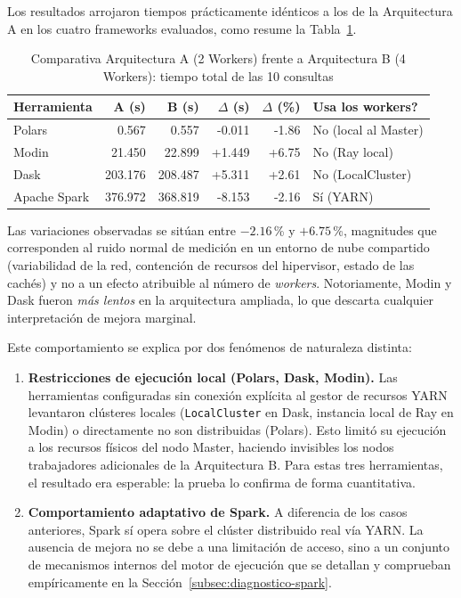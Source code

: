 Los resultados arrojaron tiempos prácticamente idénticos a los de la Arquitectura A en los cuatro frameworks evaluados, como resume la Tabla~\ref{tab:comparativa}.

\begin{table}[H]
\centering
\caption{Comparativa Arquitectura A (2 Workers) frente a Arquitectura B (4 Workers): tiempo total de las 10 consultas}
\label{tab:comparativa}
\vspace{0.2cm}
\begin{tabular}{lrrrrl}
\toprule
\textbf{Herramienta} & \textbf{A (s)} & \textbf{B (s)} & \textbf{$\Delta$ (s)} & \textbf{$\Delta$ (\%)} & \textbf{\textquestiondown{}Usa los workers?} \\
\midrule
Polars & 0.567 & 0.557 & -0.011 & -1.86 & No (local al Master) \\
Modin & 21.450 & 22.899 & +1.449 & +6.75 & No (Ray local) \\
Dask & 203.176 & 208.487 & +5.311 & +2.61 & No (LocalCluster) \\
Apache Spark & 376.972 & 368.819 & -8.153 & -2.16 & Sí (YARN) \\
\bottomrule
\end{tabular}
\end{table}

Las variaciones observadas se sitúan entre $-2.16$\,\% y $+6.75$\,\%, magnitudes que corresponden al ruido normal de medición en un entorno de nube compartido (variabilidad de la red, contención de recursos del hipervisor, estado de las cachés) y no a un efecto atribuible al número de \textit{workers}. Notoriamente, Modin y Dask fueron \textit{más lentos} en la arquitectura ampliada, lo que descarta cualquier interpretación de mejora marginal.

Este comportamiento se explica por dos fenómenos de naturaleza distinta:

\begin{enumerate}[leftmargin=*]
    \item \textbf{Restricciones de ejecución local (Polars, Dask, Modin).} Las herramientas configuradas sin conexión explícita al gestor de recursos YARN levantaron clústeres locales (\texttt{LocalCluster} en Dask, instancia local de Ray en Modin) o directamente no son distribuidas (Polars). Esto limitó su ejecución a los recursos físicos del nodo Master, haciendo invisibles los nodos trabajadores adicionales de la Arquitectura B. Para estas tres herramientas, el resultado era esperable: la prueba lo confirma de forma cuantitativa.

    \item \textbf{Comportamiento adaptativo de Spark.} A diferencia de los casos anteriores, Spark sí opera sobre el clúster distribuido real vía YARN. La ausencia de mejora no se debe a una limitación de acceso, sino a un conjunto de mecanismos internos del motor de ejecución que se detallan y comprueban empíricamente en la Sección~\ref{subsec:diagnostico-spark}.
\end{enumerate}

